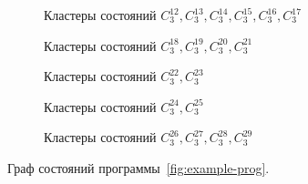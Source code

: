 \begin{figure}[H]
  \vspace{5mm}

  \begin{subfigure}{0.49\textwidth}
    \centerfloat{}
    \caption{Кластеры состояний $C_{3}^{12}, C_{3}^{13}, C_{3}^{14},
    C_{3}^{15}, C_{3}^{16}, C_{3}^{17}$}
    \label{fig:cluster-12-13-14-15-16-17}
  \end{subfigure}
  \hfill
  \begin{subfigure}{0.49\textwidth}
    \centerfloat{}
    \caption{Кластеры состояний $C_{3}^{18}, C_{3}^{19}, C_{3}^{20},
    C_{3}^{21}$}
    \label{fig:cluster-18-19-20-21}
  \end{subfigure}

  \vspace{5mm}

  \begin{subfigure}{0.32\textwidth}
    \centerfloat{}
    \caption{Кластеры состояний $C_{3}^{22}, C_{3}^{23}$}
    \label{fig:cluster-22-23}
  \end{subfigure}
  \hfill
  \begin{subfigure}{0.32\textwidth}
    \centerfloat{}
    \caption{Кластеры состояний $C_{3}^{24}, C_{3}^{25}$}
    \label{fig:cluster-24-25}
  \end{subfigure}
  \hfill
  \begin{subfigure}{0.32\textwidth}
    \centerfloat{}
    \caption{Кластеры состояний $C_{3}^{26}, C_{3}^{27}, C_{3}^{28},
    C_{3}^{29}$}
    \label{fig:cluster-26-27-28-29}
  \end{subfigure}

  \caption{Граф состояний программы~\ref{fig:example-prog}.}
  \label{fig:full-sg-for-prog}
\end{figure}
\clearpage
